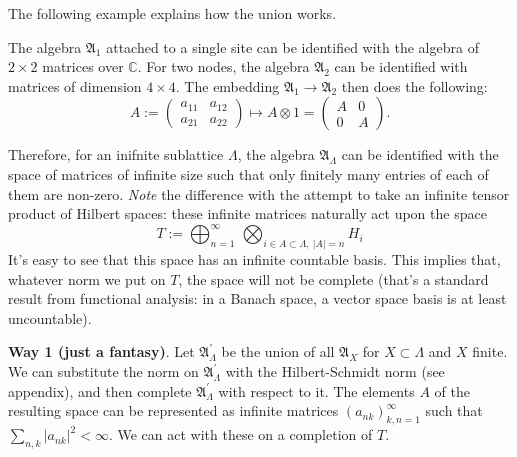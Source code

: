 The following example explains how the union works.
\begin{example}The algebra $\mathfrak A_{1}$ attached to a single site can be identified with the algebra of $2\times 2$ matrices over $\mathbb C$. For two nodes, the algebra $\mathfrak A_{2}$ can be identified with matrices of dimension $4 \times 4$. The embedding $\mathfrak A_{1} \rightarrow \mathfrak A_{2}$ then does the following:
\[
A:=\begin{pmatrix} a_{11} & a_{12}\\ a_{21} & a_{22}\end{pmatrix}
\mapsto A \otimes 1 = \begin{pmatrix} A & 0 \\ 0 & A\end{pmatrix}.
\]
\end{example}

Therefore, for an inifnite sublattice $\Lambda$, the algebra $\mathfrak A_{\Lambda}$ can be identified with the space of matrices of infinite size such that only finitely many entries of each of them are non-zero. \emph{Note} the difference with the attempt to take an infinite tensor product of Hilbert spaces: these infinite matrices naturally act upon the space 
\[
T:=\bigoplus_{n=1}^\infty \, \bigotimes_{i \in A \subset \Lambda, \ |A| = n} H_i 
\]
It's easy to see that this space has an infinite countable basis. This implies that, whatever norm we put on $T$, the space will not be complete (that's a standard result from functional analysis: in a Banach space, a vector space basis is at least uncountable).

\textbf{Way 1 (just a fantasy)}. Let $\mathfrak A_{\Lambda}^\prime$ be the union of all $\mathfrak A_X$ for $X \subset \Lambda$ and $X$ finite. We can substitute the norm on $\mathfrak A_{\Lambda}^\prime$ with the Hilbert-Schmidt norm (see appendix), and then complete $\mathfrak A_{\Lambda}^\prime$ with respect to it. The elements $A$ of the resulting space can be represented as infinite matrices $(a_{nk})_{k,n = 1}^{\infty}$ such that $\sum_{n,k} |a_{nk}|^2 < \infty$. We can act with these on a completion of $T$.


%
%
